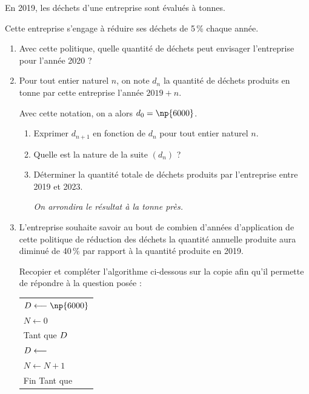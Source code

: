\medskip

En 2019, les déchets d'une entreprise sont évalués à  tonnes.

Cette entreprise s'engage à réduire ses déchets de 5\,\% chaque année.

\medskip

\begin{enumerate}
\item  Avec cette politique, quelle quantité de déchets peut envisager l'entreprise pour l'année 2020 ?
\item Pour tout entier naturel $n$, on note $d_n$ la quantité de déchets produits en tonne par cette entreprise l'année $2019+n$.

Avec cette notation, on a alors $d_0 =\np{6000}$.
\begin{enumerate}
\item  Exprimer $d_{n+1}$ en fonction de $d_n$ pour tout entier naturel $n$.
\item Quelle est la nature de la suite $\left(d_n\right)$ ?
\item Déterminer la quantité totale de déchets produits par l'entreprise entre 2019 et 2023.

\emph{On arrondira le résultat à la tonne près.}
\end{enumerate}
\item L'entreprise souhaite savoir au bout de combien d'années d'application de cette politique de réduction des déchets la quantité annuelle produite aura diminué de 40\,\% par rapport à la quantité produite en 2019.

Recopier et compléter l'algorithme ci-dessous sur la copie afin qu'il permette de répondre à la question posée :

\begin{center}
\begin{tabular}[]{|m{4cm}|}
\hline
$D\longleftarrow \np{6000}$\\
 $N \longleftarrow 0$\\
Tant que $D \dotfill $ \\
\hspace{1.5em}$D \longleftarrow \dotfill $\\
\hspace{1.5em}$N\longleftarrow N+1$\\
Fin Tant que \\
\hline
\end{tabular}
\end{center}
\end{enumerate}

\vspace{0,5cm}
